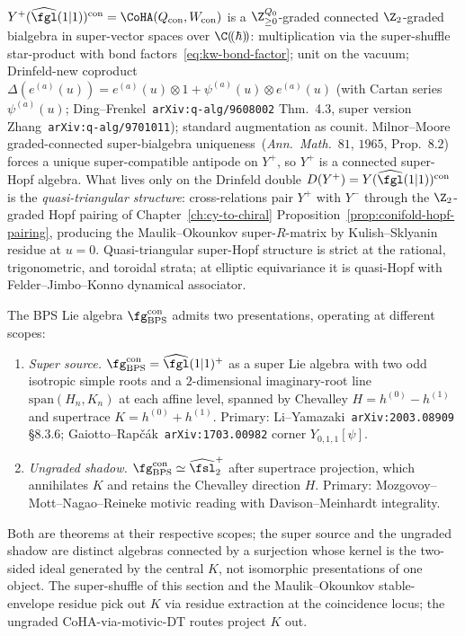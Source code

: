 \begin{remark}
\label{rem:kw-bialgebra}
$Y^+(\widehat{\fgl}(1|1))^{\mathrm{con}} = \CoHA(Q_{\mathrm{con}}, W_{\mathrm{con}})$ is a $\Z_{\geq 0}^{Q_0}$-graded connected $\Z_2$-graded bialgebra in super-vector spaces over $\C(\!(\hbar)\!)$: multiplication via the super-shuffle star-product with bond factors~\eqref{eq:kw-bond-factor}; unit on the vacuum; Drinfeld-new coproduct $\Delta(e^{(a)}(u)) = e^{(a)}(u) \otimes 1 + \psi^{(a)}(u) \otimes e^{(a)}(u)$ (with Cartan series $\psi^{(a)}(u)$; Ding--Frenkel~\texttt{arXiv:q-alg/9608002} Thm.~4.3, super version Zhang~\texttt{arXiv:q-alg/9701011}); standard augmentation as counit. Milnor--Moore graded-connected super-bialgebra uniqueness~\textup{(}\emph{Ann.~Math.}~$81$, $1965$, Prop.~$8.2$\textup{)} forces a unique super-compatible antipode on $Y^+$, so $Y^+$ is a connected super-Hopf algebra. What lives only on the Drinfeld double $D(Y^+) = Y(\widehat{\fgl}(1|1))^{\mathrm{con}}$ is the \emph{quasi-triangular structure}: cross-relations pair $Y^+$ with $Y^-$ through the $\Z_2$-graded Hopf pairing of Chapter~\ref{ch:cy-to-chiral} Proposition~\ref{prop:conifold-hopf-pairing}, producing the Maulik--Okounkov super-$R$-matrix by Kulish--Sklyanin residue at $u = 0$. Quasi-triangular super-Hopf structure is strict at the rational, trigonometric, and toroidal strata; at elliptic equivariance it is quasi-Hopf with Felder--Jimbo--Konno dynamical associator.
\end{remark}

\begin{remark}
\label{rem:kw-super-versus-shadow}
The BPS Lie algebra $\fg_{\mathrm{BPS}}^{\mathrm{con}}$ admits two presentations, operating at different scopes:
\begin{enumerate}[label=\textup{(\alph*)}]
 \item \emph{Super source.} $\fg_{\mathrm{BPS}}^{\mathrm{con}} = \widehat{\fgl}(1|1)^+$ as a super Lie algebra with two odd isotropic simple roots and a $2$-dimensional imaginary-root line $\mathrm{span}(H_n, K_n)$ at each affine level, spanned by Chevalley $H = h^{(0)} - h^{(1)}$ and supertrace $K = h^{(0)} + h^{(1)}$. Primary: Li--Yamazaki~\texttt{arXiv:2003.08909} \S8.3.6; Gaiotto--Rap\v{c}\'ak~\texttt{arXiv:1703.00982} corner $Y_{0,1,1}[\psi]$.
 \item \emph{Ungraded shadow.} $\fg_{\mathrm{BPS}}^{\mathrm{con}} \simeq \widehat{\fsl}_2^+$ after supertrace projection, which annihilates $K$ and retains the Chevalley direction $H$. Primary: Mozgovoy--Mott--Nagao--Reineke motivic reading with Davison--Meinhardt integrality.
\end{enumerate}
Both are theorems at their respective scopes; the super source and the ungraded shadow are distinct algebras connected by a surjection whose kernel is the two-sided ideal generated by the central $K$, not isomorphic presentations of one object. The super-shuffle of this section and the Maulik--Okounkov stable-envelope residue pick out $K$ via residue extraction at the coincidence locus; the ungraded CoHA-via-motivic-DT routes project $K$ out.
\end{remark}

